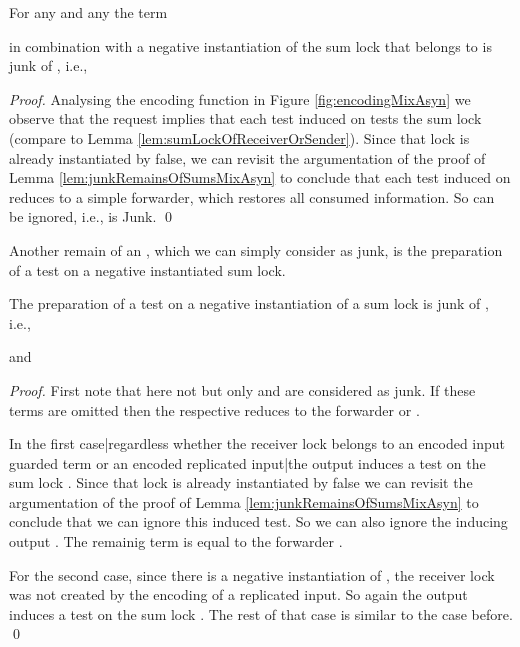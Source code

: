\documentclass[]{llncs}
\begin{document}
\begin{lemma} \label{lem:junkReceiverMixAsyn}
	For any  and any  the term
	
	in combination with a negative instantiation of the sum lock that belongs to  is junk of , i.e.,
	
\end{lemma}

\begin{proof}
	Analysing the encoding function in Figure \ref{fig:encodingMixAsyn} we observe that the request  implies that each test induced on  tests the sum lock  (compare to Lemma \ref{lem:sumLockOfReceiverOrSender}). Since that lock is already instantiated by false, we can revisit the argumentation of the proof of Lemma \ref{lem:junkRemainsOfSumsMixAsyn} to conclude that each test induced on  reduces to a simple forwarder, which restores all consumed information. So  can be ignored, i.e.,  is Junk.
	\qed
\end{proof}

Another remain of an \simulation, which we can simply consider as junk, is the preparation of a test on a negative instantiated sum lock.

\begin{lemma}  \label{lem:junkInduceTest}
	The preparation of a test on a negative instantiation of a sum lock is junk of , i.e.,
	
	and
	
\end{lemma}

\begin{proof}
	First note that here not  but only  and  are considered as junk. If these terms are omitted then the respective  reduces to the forwarder  or .
	
	In the first case|regardless whether the receiver lock  belongs to an encoded input guarded term or an encoded replicated input|the output  induces a test on the sum lock . Since that lock is already instantiated by false we can revisit the argumentation of the proof of Lemma \ref{lem:junkRemainsOfSumsMixAsyn} to conclude that we can ignore this induced test. So we can also ignore the inducing output . The remainig term  is equal to the forwarder .
	
	For the second case, since there is a negative instantiation of , the receiver lock  was not created by the encoding of a replicated input. So again the output  induces a test on the sum lock . The rest of that case is similar to the case before.
	\qed
\end{proof}
\end{document}
